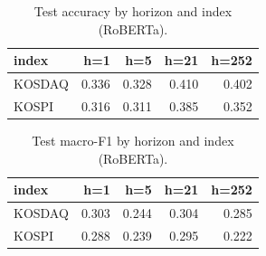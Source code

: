 \begin{table}[t]\centering
\caption{Test accuracy by horizon and index (RoBERTa).}
\begin{tabular}{lrrrr}
\toprule
index & h=1 & h=5 & h=21 & h=252 \\
\midrule
KOSDAQ & 0.336 & 0.328 & 0.410 & 0.402 \\
KOSPI & 0.316 & 0.311 & 0.385 & 0.352 \\
\bottomrule
\end{tabular}
\end{table}

\begin{table}[t]\centering
\caption{Test macro-F1 by horizon and index (RoBERTa).}
\begin{tabular}{lrrrr}
\toprule
index & h=1 & h=5 & h=21 & h=252 \\
\midrule
KOSDAQ & 0.303 & 0.244 & 0.304 & 0.285 \\
KOSPI & 0.288 & 0.239 & 0.295 & 0.222 \\
\bottomrule
\end{tabular}
\end{table}